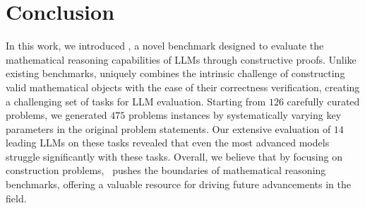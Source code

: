 \section{Conclusion} \label{sec:conclusion}

In this work, we introduced \mc, a novel benchmark designed to evaluate the mathematical reasoning capabilities of LLMs through constructive proofs.
Unlike existing benchmarks, \mc uniquely combines the intrinsic challenge of constructing valid mathematical objects with the ease of their correctness verification, creating a challenging set of tasks for LLM evaluation.
Starting from $126$ carefully curated problems, we generated $475$ problems instances by systematically varying key parameters in the original problem statements.
Our extensive evaluation of $14$ leading LLMs on these tasks revealed that even the most advanced models struggle significantly with these tasks.
Overall, we believe that by focusing on construction problems, \mc\ pushes the boundaries of mathematical reasoning benchmarks, offering a valuable resource for driving future advancements in the field.
